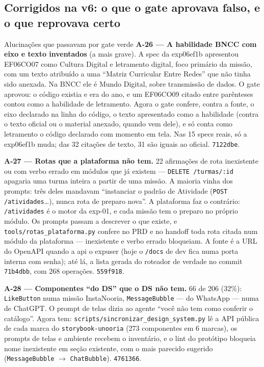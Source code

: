 \documentclass[11pt,a4paper]{article}
\begin{document}
\subsection{Corrigidos na v6: o que o gate aprovava falso, e o que reprovava certo}

\begin{alertabox}{Alucinações que passavam por gate verde}
\textbf{A-26 --- A habilidade BNCC com eixo e texto inventados} (a mais grave). A spec da exp06ef1b apresentou EF06CO07 como Cultura Digital e letramento digital, foco primário da missão, com um texto atribuído a uma ``Matriz Curricular Entre Redes'' que não tinha sido anexada. Na BNCC ele é Mundo Digital, sobre transmissão de dados. O gate aprovou: o código existia e era do ano, e um EF06CO09 citado entre parênteses contou como a habilidade de letramento. Agora o gate confere, contra a fonte, o eixo declarado na linha do código, o texto apresentado como a habilidade (contra o texto oficial ou o material anexado, quando vem dele), e só conta como letramento o código declarado com momento em tela. Nas 15 specs reais, só a exp06ef1b muda; das 32 citações de texto, 31 são iguais ao oficial. \texttt{7122dbe}.

\medskip
\textbf{A-27 --- Rotas que a plataforma não tem.} 22 afirmações de rota inexistente ou com verbo errado em módulos que já existem --- \texttt{DELETE /turmas/:id} apagaria uma turma inteira a partir de uma missão. A maioria vinha dos prompts: três deles mandavam ``instanciar o padrão de Atividade (\texttt{POST /atividades}\ldots), nunca rota de preparo nova''. A plataforma faz o contrário: \texttt{/atividades} é o motor da exp-01, e cada missão tem o preparo no próprio módulo. Os prompts passam a descrever o que existe, e \texttt{tools/rotas\_plataforma.py} confere no PRD e no handoff toda rota citada num módulo da plataforma --- inexistente e verbo errado bloqueiam. A fonte é a URL do OpenAPI quando a api o expuser (hoje o \texttt{/docs} de dev fica numa porta interna com senha); até lá, a lista gerada do roteador de verdade no commit \texttt{71b4dbb}, com 268 operações. \texttt{559f918}.

\medskip
\textbf{A-28 --- Componentes ``do DS'' que o DS não tem.} 66 de 206 (32\%): \texttt{LikeButton} numa missão InstaNooria, \texttt{MessageBubble} --- do WhatsApp --- numa de ChatGPT. O prompt de telas dizia ao agente ``você não tem como conferir o catálogo''. Agora tem: \texttt{scripts/sincronizar\_design\_system.py} lê a API pública de cada marca do \texttt{storybook-unooria} (273 componentes em 6 marcas), os prompts de telas e ambiente recebem o inventário, e o lint do protótipo bloqueia nome inexistente em seção existente, com o mais parecido sugerido (\texttt{MessageBubble} $\rightarrow$ \texttt{ChatBubble}). \texttt{4761366}.
\end{alertabox}
\end{document}
